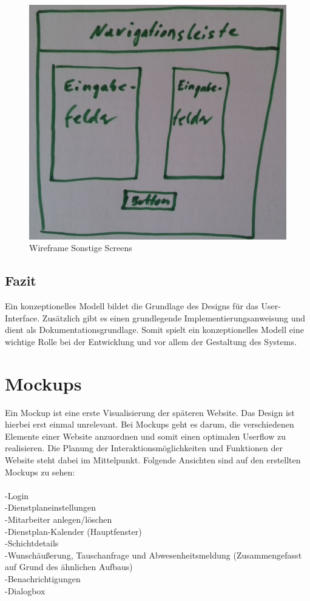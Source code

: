 \documentclass[11pt,
paper=a4,
bibtotocnumbered,	  %
liststotocnumbered,  %
DIV=calc,		  %
tablecaptionabove,	  %
headinclude,
]{article}
\begin{document}
\begin{figure}[H]
\includegraphics[width=1\textwidth]{Bilder/Wireframe2.jpg}
\caption{Wireframe Sonstige Screens}
\end{figure}
\subsection{Fazit}
Ein konzeptionelles Modell bildet die Grundlage des Designs für das User-Interface. Zusätzlich gibt es einen grundlegende Implementierungsanweisung und dient als Dokumentationsgrundlage. Somit spielt ein konzeptionelles Modell eine wichtige Rolle bei der Entwicklung und vor allem der Gestaltung des Systems.
\section{Mockups}
Ein Mockup ist eine erste Visualisierung der späteren Website. Das Design ist hierbei erst einmal unrelevant. Bei Mockups geht es darum, die verschiedenen Elemente einer Website anzuordnen und somit einen optimalen Userflow zu realisieren. Die Planung der Interaktionsmöglichkeiten und Funktionen der Website steht dabei im Mittelpunkt.
Folgende Ansichten sind auf den erstellten Mockups zu sehen: \\\\
-Login\\
-Dienstplaneinstellungen\\
-Mitarbeiter anlegen/löschen\\
-Dienstplan-Kalender (Hauptfenster)\\
-Schichtdetails\\
-Wunschäußerung, Tauschanfrage und Abwesenheitsmeldung (Zusammengefasst auf Grund des ähnlichen Aufbaus)\\
-Benachrichtigungen\\
-Dialogbox\\
\end{document}
